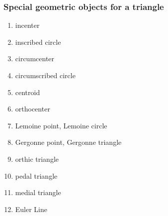 \documentclass[12pt]{article}
\begin{document}
\subsubsection*{Special geometric objects for a triangle}
\begin{enumerate}
\item incenter 
\item inscribed circle
\item circumcenter
\item circumscribed circle 
\item centroid
\item orthocenter
\item Lemoine point, Lemoine circle  
\item Gergonne point, Gergonne triangle 
\item orthic triangle 
\item pedal triangle 
\item medial triangle 
\item Euler Line 
\end{enumerate}
\end{document}
